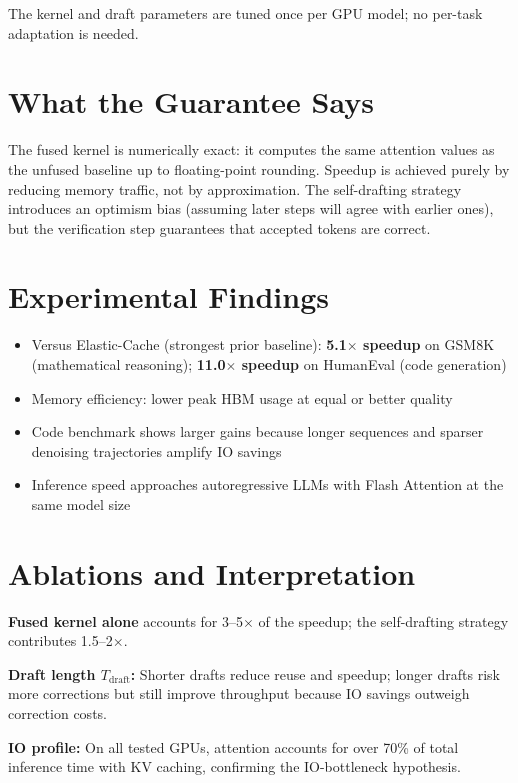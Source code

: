 \documentclass[10pt,twocolumn]{article}
\begin{document}
The kernel and draft parameters are tuned once per GPU model; no per-task
adaptation is needed.

\section{What the Guarantee Says}

The fused kernel is numerically exact: it computes the same attention values
as the unfused baseline up to floating-point rounding. Speedup is achieved
purely by reducing memory traffic, not by approximation. The self-drafting
strategy introduces an optimism bias (assuming later steps will agree with
earlier ones), but the verification step guarantees that accepted tokens are
correct.

\section{Experimental Findings}

\begin{itemize}[itemsep=2pt,parsep=0pt]
  \item Versus Elastic-Cache (strongest prior baseline):
    \textbf{5.1$\times$ speedup} on GSM8K (mathematical reasoning);
    \textbf{11.0$\times$ speedup} on HumanEval (code generation)
  \item Memory efficiency: lower peak HBM usage at equal or better quality
  \item Code benchmark shows larger gains because longer sequences and sparser
    denoising trajectories amplify IO savings
  \item Inference speed approaches autoregressive LLMs with Flash Attention
    at the same model size
\end{itemize}

\section{Ablations and Interpretation}

\textbf{Fused kernel alone} accounts for 3--5$\times$ of the speedup; the
self-drafting strategy contributes 1.5--2$\times$.

\textbf{Draft length $T_{\mathrm{draft}}$:} Shorter drafts reduce reuse and
speedup; longer drafts risk more corrections but still improve throughput
because IO savings outweigh correction costs.

\textbf{IO profile:} On all tested GPUs, attention accounts for over 70\% of
total inference time with KV caching, confirming the IO-bottleneck hypothesis.
\end{document}
